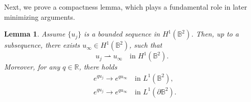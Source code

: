 \documentclass[11pt,a4paper,twoside]{amsart}
\newtheorem{lemma}[theorem]{Lemma}
\newtheorem{sketch proof}{Sketch of the proof}[section]
\begin{document}
    
    Next, we prove a compactness lemma, which plays a fundamental role in later minimizing arguments.
    \begin{lemma}\label{lem. compactness in H1}
        Assume $\{u_j\}$ is a bounded sequence in $H^1(\mathbb{B}^2)$. Then, up to a subsequence, there exists $u_\infty\in H^1(\mathbb{B}^2)$, such that
        \[
        u_j\rightharpoonup u_\infty \quad \text{in } H^1(\mathbb{B}^2).
        \]
        Moreover, for any $q\in\mathbb{R}$, there holds
        \begin{align*}
            &e^{qu_j}\to e^{qu_\infty}
            \quad \text{in }L^1(\mathbb{B}^2),\\
            &e^{qu_j}\to e^{qu_\infty}
            \quad 
            \text{in }L^1(\partial\mathbb{B}^2).
        \end{align*}
    \end{lemma}
\end{document}
